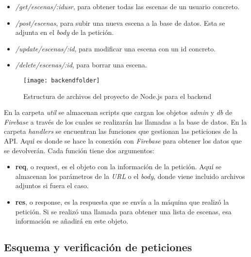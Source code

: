 \begin{itemize}
    \item \textit{/get/escenas/:idusr}, para obtener todas las escenas de un usuario concreto.
    \item \textit{/post/escenas}, para subir una nueva escena a la base de datos. Esta se adjunta en el \textit{body} de la petición.
    \item \textit{/update/escenas/:id}, para modificar una escena con un id concreto.
    \item \textit{/delete/escenas/:id}, para borrar una escena.
\end{itemize}

\begin{figure}[h]
    \centering
    \texttt{[image: backendfolder]}
    \caption[Estructura de archivos de backend]{Estructura de archivos del proyecto de Node.js para el backend}
\end{figure}

En la carpeta \textit{util} se almacenan scripts que cargan los objetos \textit{admin} y \textit{db} de \textit{Firebase} a través de los cuales se realizarán las llamadas a la base de datos. En la carpeta \textit{handlers} se encuentran las funciones que gestionan las peticiones de la API. Aquí es donde se hace la conexión con \textit{Firebase} para obtener los datos que se devolverán. Cada función tiene dos argumentos:

\begin{itemize}
    \item \textbf{req}, o request, es el objeto con la información de la petición. Aquí se almacenan los parámetros de la \textit{URL} o el \textit{body}, donde viene incluido archivos adjuntos si fuera el caso.
    \item \textbf{res}, o response, es la respuesta que se envía a la máquina que realizó la petición. Si se realizó una llamada para obtener una lista de escenas, esa información se añadirá en este objeto.
\end{itemize}

\subsection{Esquema y verificación de peticiones}

